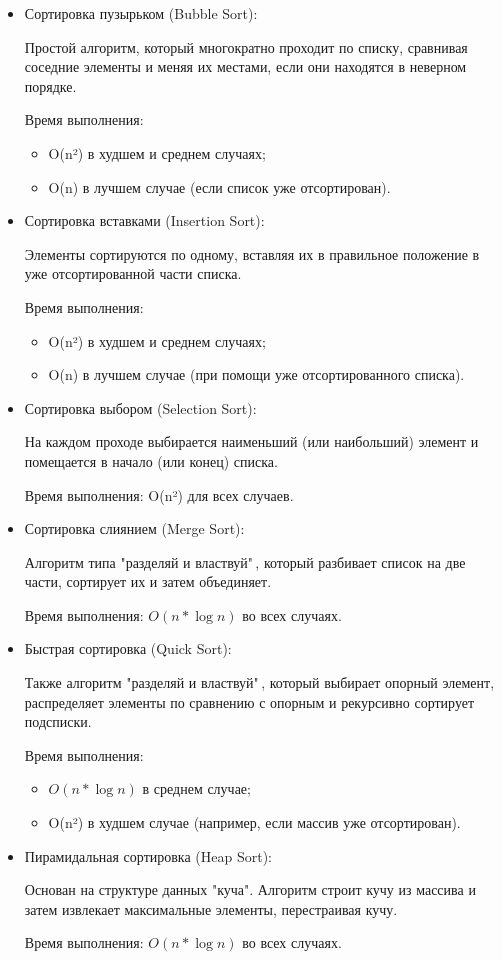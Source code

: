 \begin{itemize}

\item Сортировка пузырьком (Bubble Sort):

Простой алгоритм, который многократно проходит по списку, сравнивая соседние элементы и меняя их местами, если они находятся в неверном порядке.

Время выполнения:
\begin{itemize}
\item O(n²) в худшем и среднем случаях;
\item O(n) в лучшем случае (если список уже отсортирован).
\end{itemize}

\item Сортировка вставками (Insertion Sort):

Элементы сортируются по одному, вставляя их в правильное положение в уже отсортированной части списка.

Время выполнения:
\begin{itemize}
\item O(n²) в худшем и среднем случаях;
\item O(n) в лучшем случае (при помощи уже отсортированного списка).
\end{itemize}

\item Сортировка выбором (Selection Sort):

На каждом проходе выбирается наименьший (или наибольший) элемент и помещается в начало (или конец) списка.

Время выполнения: O(n²) для всех случаев.

\item Сортировка слиянием (Merge Sort):

Алгоритм типа "разделяй и властвуй"\,, который разбивает список на две части, сортирует их и затем объединяет.

Время выполнения: \(O(n * \log n)\) во всех случаях.

\item Быстрая сортировка (Quick Sort):

Также алгоритм "разделяй и властвуй"\,, который выбирает опорный элемент, распределяет элементы по сравнению с опорным и рекурсивно сортирует подсписки.

Время выполнения:
\begin{itemize}
\item \(O(n * \log n)\) в среднем случае;
\item O(n²) в худшем случае (например, если массив уже отсортирован).
\end{itemize}

\item Пирамидальная сортировка (Heap Sort):

Основан на структуре данных "куча". Алгоритм строит кучу из массива и затем извлекает максимальные элементы, перестраивая кучу.

Время выполнения: \(O(n * \log n)\) во всех случаях.

\end{itemize}

